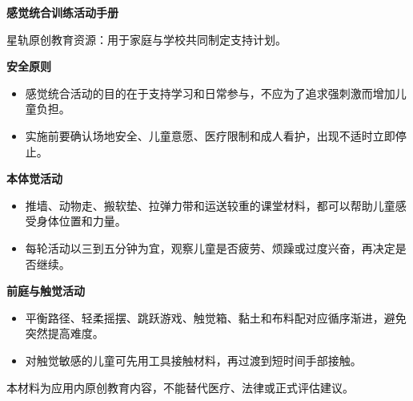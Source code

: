 \documentclass[11pt]{article}
\begin{document}
{\color[HTML]{1F5FD2}\LARGE\bfseries 感觉统合训练活动手册\par}
{\color[HTML]{667085}\small 星轨原创教育资源：用于家庭与学校共同制定支持计划。\par}
\vspace{0.8em}
{\color[HTML]{111827}\large\bfseries 安全原则\par}
\begin{itemize}
\item 感觉统合活动的目的在于支持学习和日常参与，不应为了追求强刺激而增加儿童负担。
\item 实施前要确认场地安全、儿童意愿、医疗限制和成人看护，出现不适时立即停止。
\end{itemize}
{\color[HTML]{111827}\large\bfseries 本体觉活动\par}
\begin{itemize}
\item 推墙、动物走、搬软垫、拉弹力带和运送较重的课堂材料，都可以帮助儿童感受身体位置和力量。
\item 每轮活动以三到五分钟为宜，观察儿童是否疲劳、烦躁或过度兴奋，再决定是否继续。
\end{itemize}
{\color[HTML]{111827}\large\bfseries 前庭与触觉活动\par}
\begin{itemize}
\item 平衡路径、轻柔摇摆、跳跃游戏、触觉箱、黏土和布料配对应循序渐进，避免突然提高难度。
\item 对触觉敏感的儿童可先用工具接触材料，再过渡到短时间手部接触。
\end{itemize}
\vfill
{\color[HTML]{667085}\footnotesize 本材料为应用内原创教育内容，不能替代医疗、法律或正式评估建议。\par}
\end{document}
